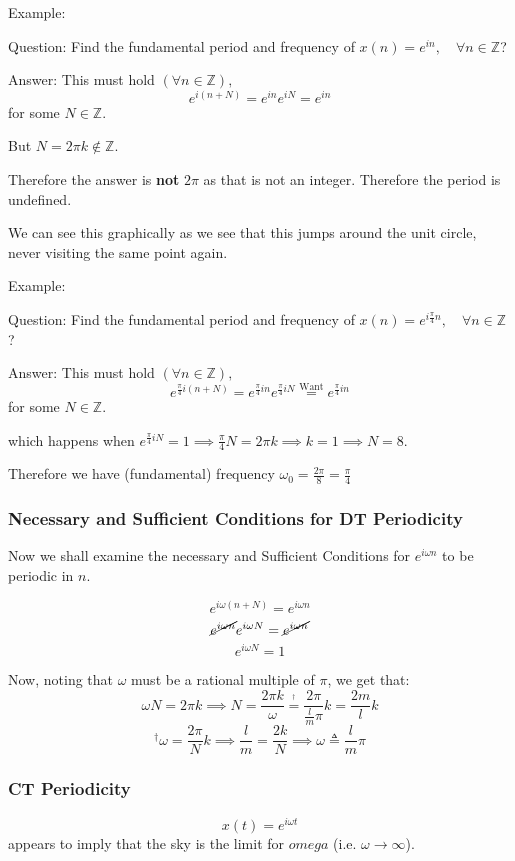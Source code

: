 Example:
\begin{shaded}
Question: Find the fundamental period and frequency of $x(n)=e^{in}, \quad\forall n\in\mathbb Z$?

Answer:
This must hold $(\forall n\in\mathbb Z),$
\[
    e^{i(n+N)} = e^{in}e^{iN} = e^{in}
\]
for some $N\in\mathbb Z$.

But $N=2\pi k\not\in\mathbb Z$.

Therefore the answer is \textbf{not} $2\pi$ as that is not an integer. Therefore the period is undefined.

We can see this graphically as we see that this jumps around the unit circle, never visiting the same point again.
\end{shaded}

Example:
\begin{shaded}
Question: Find the fundamental period and frequency of $x(n)=e^{i\frac\pi4n}, \quad\forall n\in\mathbb Z$?

Answer:
This must hold $(\forall n\in\mathbb Z),$
\[
    e^{\frac\pi4i(n+N)} = e^{\frac\pi4in}e^{\frac\pi4iN} \stackrel{\text{Want}}= e^{\frac\pi4in}
\]
for some $N\in\mathbb Z$.

which happens when $e^{\frac\pi4iN}=1\implies \frac\pi4N=2\pi k\implies k = 1\implies N = 8$.

Therefore we have (fundamental) frequency $\omega_0=\frac{2\pi}8=\frac\pi4$
\end{shaded}

\subsubsection{Necessary and Sufficient Conditions for DT Periodicity}
Now we shall examine the necessary and Sufficient Conditions for $e^{i\omega n}$ to be periodic in $n$.

\[
    e^{i\omega (n+N)} = e^{i\omega n}
\]
\[
    \cancel{e^{i\omega n}}e^{i\omega N} = \cancel{e^{i\omega n}}
\]
\[
    \boxed{e^{i\omega N} = 1}
\]

Now, noting that $\omega$ must be a rational multiple of $\pi$, we get that:
\[
    \omega N = 2\pi k \implies N=\frac{2\pi k}\omega\stackrel{^\dagger}=\frac{2\pi}{\frac l m \pi}k = \frac{2m}l k
\]
\[
    ^\dagger\omega = \frac{2\pi}N k \implies \frac l m = \frac{2k}N\implies \omega\triangleq\frac l m \pi
\]

\subsubsection{CT Periodicity}
\[
    x(t) = e^{i\omega t}
\]
appears to imply that the sky is the limit for $omega$ (i.e. $\omega\to\infty$).


